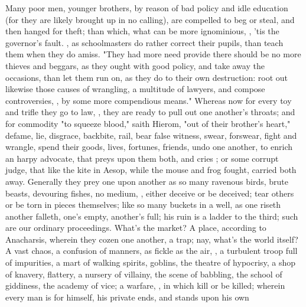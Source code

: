 Many poor men, younger brothers, \etc{} by reason of bad
policy and idle education (for they are likely brought up in no calling), are
compelled to beg or steal, and then hanged for theft; than which, what can be
more ignominious, , 'tis the governor's fault. , as schoolmasters do rather correct their pupils, than teach them when
they do amiss. "They had more need provide there should be
no more thieves and beggars, as they ought with good policy, and take away the
occasions, than let them run on, as they do to their own destruction: root out
likewise those causes of wrangling, a multitude of lawyers, and compose
controversies, , by some more compendious
means." Whereas now for every toy and trifle they go to law,
, they are ready to pull out one another's throats; and
for commodity "to squeeze blood," saith Hierom, "out of
their brother's heart," defame, lie, disgrace, backbite, rail, bear false
witness, swear, forswear, fight and wrangle, spend their goods, lives,
fortunes, friends, undo one another, to enrich an harpy advocate, that preys
upon them both, and cries ; or some corrupt
judge, that like the kite in Aesop, while the mouse and
frog fought, carried both away. Generally they prey one upon another as so many
ravenous birds, brute beasts, devouring fishes, no medium,
, either deceive or be deceived; tear others
or be torn in pieces themselves; like so many buckets in a well, as one riseth
another falleth, one's empty, another's full; his ruin is a ladder to the
third; such are our ordinary proceedings. What's the market? A place, according
to Anacharsis, wherein they cozen one another, a trap; nay,
what's the world itself? A vast chaos, a confusion of
manners, as fickle as the air, , a turbulent troop
full of impurities, a mart of walking spirits, goblins, the theatre of
hypocrisy, a shop of knavery, flattery, a nursery of villainy, the scene of
babbling, the school of giddiness, the academy of vice; a warfare, , in which kill or be killed;
wherein every man is for himself, his private ends, and stands upon his own
